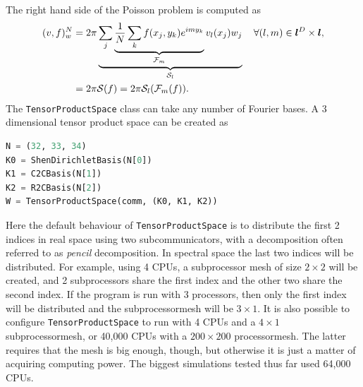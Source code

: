\documentclass[%
oneside,                 %
final,                   %
10pt]{article}
\theoremstyle{definition}
\begin{document}
The right hand side of the Poisson problem is computed as
\begin{align}
(v, f)_w^N &= 2\pi \underbrace{\sum_{j}\underbrace{\frac{1}{N} \sum_{k} f(x_j, y_k) e^{imy_k} }_{\mathcal{F}_m} v_l(x_j)   w_j}_{\mathcal{S}_l} \quad \forall (l, m) \in \boldsymbol{l}^D \times \boldsymbol{l}, \notag \\ 
  &= 2\pi \mathcal{S}(f) = 2 \pi \mathcal{S}_l(\mathcal{F}_m(f)).
\end{align}
The \texttt{TensorProductSpace} class can take any number of Fourier bases. A 3 dimensional tensor product space can be created as
\begin{lstlisting}[language=Python,style=yellow2_fb]
N = (32, 33, 34)
K0 = ShenDirichletBasis(N[0])
K1 = C2CBasis(N[1])
K2 = R2CBasis(N[2])
W = TensorProductSpace(comm, (K0, K1, K2))
\end{lstlisting}
Here the default behaviour of \texttt{TensorProductSpace} is to distribute the first 2 indices in real space using two subcommunicators, with a decomposition often referred to as \emph{pencil} decomposition. In spectral space the last two indices will be distributed. For example, using 4 CPUs, a subprocessor mesh of size $2 \times 2$ will be created, and 2 subprocessors share the first index and the other two share the second index.  If the program is run with 3 processors, then only the first index will be distributed and the subprocessormesh will be $3 \times 1$. It is also possible to configure \texttt{TensorProductSpace} to run with 4 CPUs and a $4 \times 1$ subprocessormesh, or 40,000 CPUs with a $200 \times 200$ processormesh. The latter requires that the mesh is big enough, though, but otherwise it is just a matter of acquiring computing power. The biggest simulations tested thus far used 64,000 CPUs. 
\end{document}
